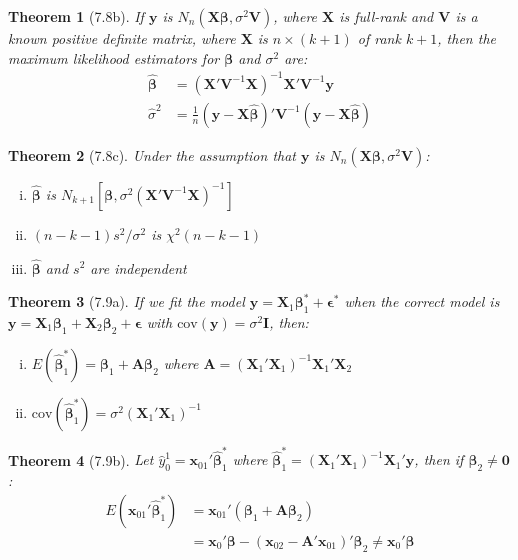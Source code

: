\documentclass{article}
\newtheorem{theorem}{Theorem}[section]
\begin{document}
\begin{theorem}[7.8b]
If $\mathbf{y}$ is $N_n(\mathbf{X}\boldsymbol{\beta}, \sigma^2\mathbf{V})$, where $\mathbf{X}$ is full-rank and $\mathbf{V}$ is a known positive definite matrix, where $\mathbf{X}$ is $n \times (k+1)$ of rank $k+1$, then the maximum likelihood estimators for $\boldsymbol{\beta}$ and $\sigma^2$ are:
\begin{align*}
\hat{\boldsymbol{\beta}} &= (\mathbf{X}'\mathbf{V}^{-1}\mathbf{X})^{-1}\mathbf{X}'\mathbf{V}^{-1}\mathbf{y} \\
\hat{\sigma}^2 &= \frac{1}{n}(\mathbf{y} - \mathbf{X}\hat{\boldsymbol{\beta}})'\mathbf{V}^{-1}(\mathbf{y} - \mathbf{X}\hat{\boldsymbol{\beta}})
\end{align*}
\end{theorem}

\begin{theorem}[7.8c]
Under the assumption that $\mathbf{y}$ is $N_n(\mathbf{X}\boldsymbol{\beta}, \sigma^2\mathbf{V})$:
\begin{enumerate}[(i)]
\item $\hat{\boldsymbol{\beta}}$ is $N_{k+1}[\boldsymbol{\beta}, \sigma^2(\mathbf{X}'\mathbf{V}^{-1}\mathbf{X})^{-1}]$
\item $(n-k-1)s^2/\sigma^2$ is $\chi^2(n-k-1)$
\item $\hat{\boldsymbol{\beta}}$ and $s^2$ are independent
\end{enumerate}
\end{theorem}

\begin{theorem}[7.9a]
If we fit the model $\mathbf{y} = \mathbf{X}_1\boldsymbol{\beta}_1^* + \boldsymbol{\epsilon}^*$ when the correct model is $\mathbf{y} = \mathbf{X}_1\boldsymbol{\beta}_1 + \mathbf{X}_2\boldsymbol{\beta}_2 + \boldsymbol{\epsilon}$ with $\text{cov}(\mathbf{y}) = \sigma^2\mathbf{I}$, then:
\begin{enumerate}[(i)]
\item $E(\hat{\boldsymbol{\beta}}_1^*) = \boldsymbol{\beta}_1 + \mathbf{A}\boldsymbol{\beta}_2$ where $\mathbf{A} = (\mathbf{X}_1'\mathbf{X}_1)^{-1}\mathbf{X}_1'\mathbf{X}_2$
\item $\text{cov}(\hat{\boldsymbol{\beta}}_1^*) = \sigma^2(\mathbf{X}_1'\mathbf{X}_1)^{-1}$
\end{enumerate}
\end{theorem}

\begin{theorem}[7.9b]
Let $\hat{y}_0^1 = \mathbf{x}_{01}'\hat{\boldsymbol{\beta}}_1^*$ where $\hat{\boldsymbol{\beta}}_1^* = (\mathbf{X}_1'\mathbf{X}_1)^{-1}\mathbf{X}_1'\mathbf{y}$, then if $\boldsymbol{\beta}_2 \neq \mathbf{0}$:
\begin{align*}
E(\mathbf{x}_{01}'\hat{\boldsymbol{\beta}}_1^*) &= \mathbf{x}_{01}'(\boldsymbol{\beta}_1 + \mathbf{A}\boldsymbol{\beta}_2) \\
&= \mathbf{x}_0'\boldsymbol{\beta} - (\mathbf{x}_{02} - \mathbf{A}'\mathbf{x}_{01})'\boldsymbol{\beta}_2 \neq \mathbf{x}_0'\boldsymbol{\beta}
\end{align*}
\end{theorem}
\end{document}
